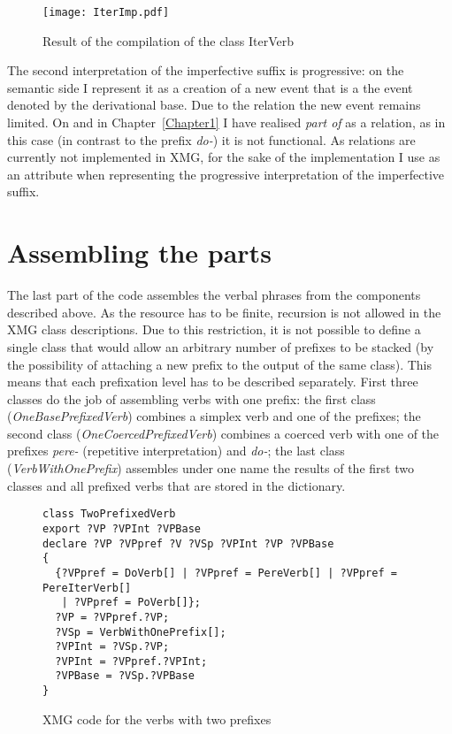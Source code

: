 \begin{figure}
\texttt{[image: IterImp.pdf]}
\caption{Result of the compilation of the class IterVerb \label{fig:iter}}
\end{figure}

The second interpretation of the imperfective suffix is progressive: on the semantic side I represent it as a creation of a new event that is a \PARTOF the event denoted by the derivational base. Due to the \PARTOF relation the new event remains limited. On  and  in Chapter~\ref{Chapter1} I have realised \textit{part of} as a relation, as in this case (in contrast to the prefix \textit{do-}) it is not functional. As relations are currently not implemented in XMG, for the sake of the implementation I use \PARTOF as an attribute when representing the progressive interpretation of the imperfective suffix.

\section{Assembling the parts}
The last part of the code assembles the verbal phrases from the components described above. As the resource has to be finite, recursion is not allowed in the XMG class descriptions.  Due to this restriction, it is not possible to define a single class that would allow an arbitrary number of prefixes to be stacked (by the possibility of attaching a new prefix to the output of the same class). This means that each prefixation level has to be described separately. First three classes do the job of assembling verbs with one prefix: the first class (\textit{OneBasePrefixedVerb}) combines a simplex verb and one of the prefixes; the second class (\textit{OneCoercedPrefixedVerb}) combines a coerced verb with one of the prefixes \textit{pere-} (repetitive interpretation) and \textit{do-}; the last class (\textit{VerbWithOnePrefix}) assembles under one name the results of the first two classes and all prefixed verbs that are stored in the dictionary. 

\begin{figure}
\begin{verbatim}
class TwoPrefixedVerb
export ?VP ?VPInt ?VPBase
declare ?VP ?VPpref ?V ?VSp ?VPInt ?VP ?VPBase
{
  {?VPpref = DoVerb[] | ?VPpref = PereVerb[] | ?VPpref = PereIterVerb[] 
   | ?VPpref = PoVerb[]};
  ?VP = ?VPpref.?VP;
  ?VSp = VerbWithOnePrefix[];
  ?VPInt = ?VSp.?VP;
  ?VPInt = ?VPpref.?VPInt;
  ?VPBase = ?VSp.?VPBase
}
\end{verbatim}
\caption{XMG code for the verbs with two prefixes \label{xmg:2pref}}
\end{figure}

